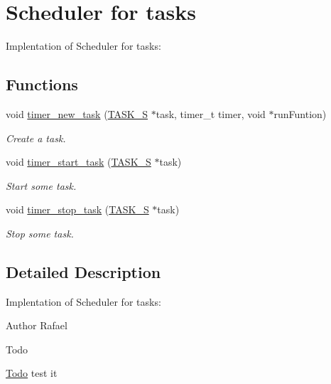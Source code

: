 \hypertarget{group__taskS}{\section{Scheduler for tasks}
\label{group__taskS}
}


Implentation of Scheduler for tasks\-:  


\subsection*{Functions}
\begin{DoxyCompactItemize}
\item 
void \hyperlink{group__taskS_gaf56f9692a592fdc4b0f74aaac3b76168}{timer\-\_\-new\-\_\-task} (\hyperlink{structTASK__S}{T\-A\-S\-K\-\_\-\-S} $\ast$task, timer\-\_\-t timer, void $\ast$run\-Funtion)
\begin{DoxyCompactList}\small\item\em Create a task. \end{DoxyCompactList}\item 
void \hyperlink{group__taskS_gac088a054258396a6e2dba77908f22b42}{timer\-\_\-start\-\_\-task} (\hyperlink{structTASK__S}{T\-A\-S\-K\-\_\-\-S} $\ast$task)
\begin{DoxyCompactList}\small\item\em Start some task. \end{DoxyCompactList}\item 
void \hyperlink{group__taskS_ga8e48eacaac7d9cf7d82cc71cfbcd4b56}{timer\-\_\-stop\-\_\-task} (\hyperlink{structTASK__S}{T\-A\-S\-K\-\_\-\-S} $\ast$task)
\begin{DoxyCompactList}\small\item\em Stop some task. \end{DoxyCompactList}\end{DoxyCompactItemize}


\subsection{Detailed Description}
Implentation of Scheduler for tasks\-: \begin{DoxyAuthor}{Author}
Rafael 
\end{DoxyAuthor}
\begin{DoxyRefDesc}{Todo}
\item[\hyperlink{todo__todo000004}{Todo}]test it \end{DoxyRefDesc}


